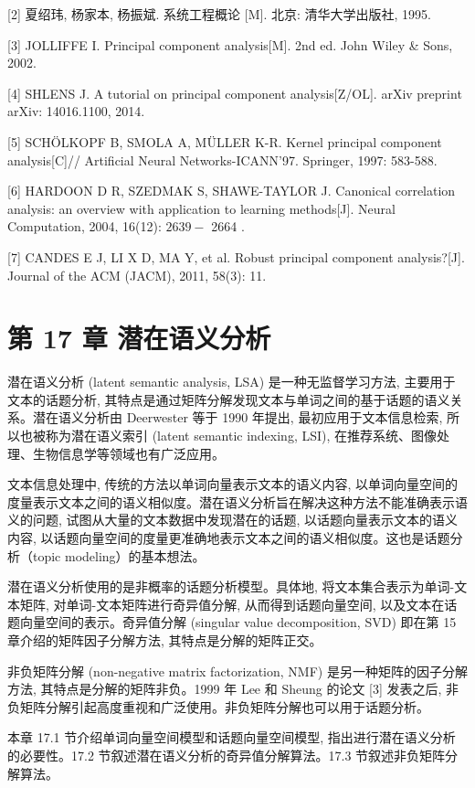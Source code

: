 \documentclass[10pt]{article}
\begin{document}
[2] 夏绍玮, 杨家本, 杨振斌. 系统工程概论 [M]. 北京: 清华大学出版社, 1995.

[3] JOLLIFFE I. Principal component analysis[M]. 2nd ed. John Wiley \& Sons, 2002.

[4] SHLENS J. A tutorial on principal component analysis[Z/OL]. arXiv preprint arXiv: 14016.1100, 2014.

[5] SCHÖLKOPF B, SMOLA A, MÜLLER K-R. Kernel principal component analysis[C]// Artificial Neural Networks-ICANN'97. Springer, 1997: 583-588.

[6] HARDOON D R, SZEDMAK S, SHAWE-TAYLOR J. Canonical correlation analysis: an overview with application to learning methods[J]. Neural Computation, 2004, 16(12): $2639-$ 2664 .

[7] CANDES E J, LI X D, MA Y, et al. Robust principal component analysis?[J]. Journal of the ACM (JACM), 2011, 58(3): 11.

\section*{第 17 章 潜在语义分析}
潜在语义分析 (latent semantic analysis, LSA) 是一种无监督学习方法, 主要用于文本的话题分析, 其特点是通过矩阵分解发现文本与单词之间的基于话题的语义关系。潜在语义分析由 Deerwester 等于 1990 年提出, 最初应用于文本信息检索, 所以也被称为潜在语义索引 (latent semantic indexing, LSI), 在推荐系统、图像处理、生物信息学等领域也有广泛应用。

文本信息处理中, 传统的方法以单词向量表示文本的语义内容, 以单词向量空间的度量表示文本之间的语义相似度。潜在语义分析旨在解决这种方法不能准确表示语义的问题, 试图从大量的文本数据中发现潜在的话题, 以话题向量表示文本的语义内容, 以话题向量空间的度量更准确地表示文本之间的语义相似度。这也是话题分析（topic modeling）的基本想法。

潜在语义分析使用的是非概率的话题分析模型。具体地, 将文本集合表示为单词-文本矩阵, 对单词-文本矩阵进行奇异值分解, 从而得到话题向量空间, 以及文本在话题向量空间的表示。奇异值分解 (singular value decomposition, SVD) 即在第 15 章介绍的矩阵因子分解方法, 其特点是分解的矩阵正交。

非负矩阵分解 (non-negative matrix factorization, NMF) 是另一种矩阵的因子分解方法, 其特点是分解的矩阵非负。1999 年 Lee 和 Sheung 的论文 [3] 发表之后, 非负矩阵分解引起高度重视和广泛使用。非负矩阵分解也可以用于话题分析。

本章 17.1 节介绍单词向量空间模型和话题向量空间模型, 指出进行潜在语义分析的必要性。17.2 节叙述潜在语义分析的奇异值分解算法。17.3 节叙述非负矩阵分解算法。
\end{document}
